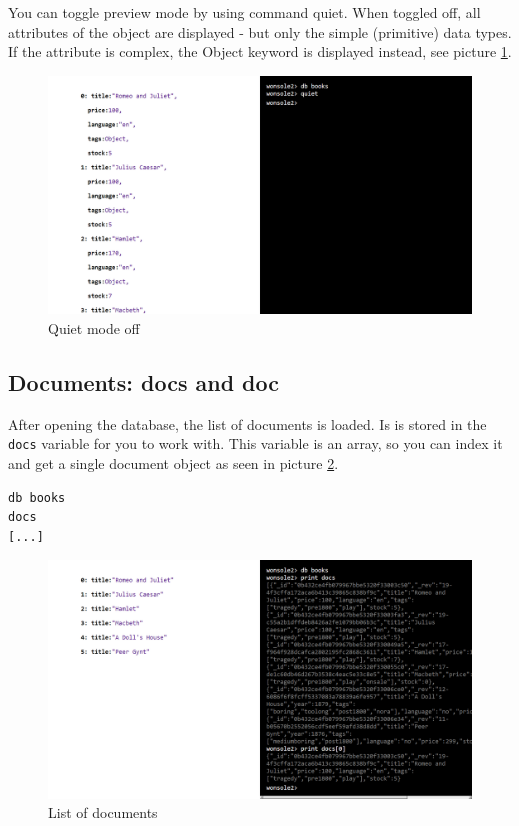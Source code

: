 You can toggle preview mode by using command quiet. When toggled off, all
attributes of the object are displayed - but only the simple (primitive) data types. If the
attribute is complex, the Object keyword is displayed instead, see picture
\ref{wonsole2-20}.

\begin{figure}
\centering
\includegraphics[width=\textwidth]{../../manual/screenshot/wonsole2/wonsole2-20.png}
\caption{Quiet mode off}
\label{wonsole2-20}
\end{figure}


\subsection{Documents: docs and doc}
After opening the database, the list of documents is loaded. Is is stored in the
\verb|docs| variable for you to work with. This variable is an array, so you can
index it and get a single document object as seen in picture \ref{wonsole2-26}.

\begin{verbatim}
db books
docs
[...]
\end{verbatim}
 

\begin{figure}
\centering
\includegraphics[width=\textwidth]{../../manual/screenshot/wonsole2/wonsole2-26.png}
\caption{List of documents}
\label{wonsole2-26}
\end{figure}

